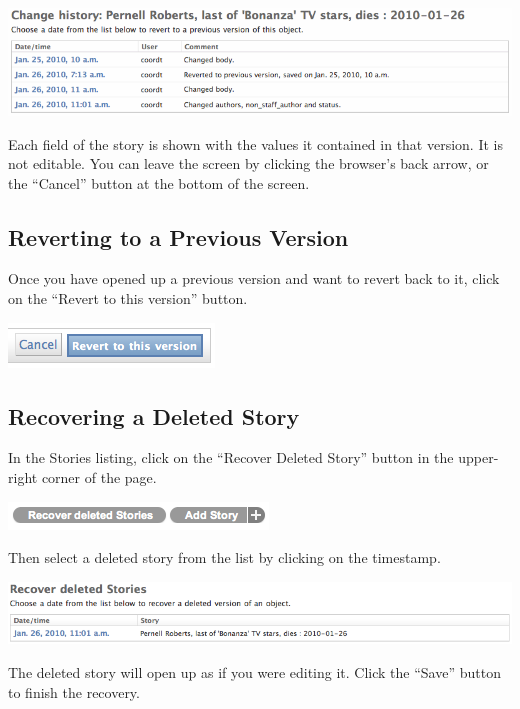 \documentclass[letterpaper,10pt,english]{manual}
\begin{document}
\includegraphics{history_list.png}

Each field of the story is shown with the values it contained in that version. It is not editable. You can leave the screen by clicking the browser's back arrow, or the ``Cancel'' button at the bottom of the screen.


\subsection{Reverting to a Previous Version}

Once you have opened up a previous version and want to revert back to it, click on the ``Revert to this version'' button.

\includegraphics{history_save_btn.png}


\subsection{Recovering a Deleted Story}

In the Stories listing, click on the ``Recover Deleted Story'' button in the upper-right corner of the page.

\includegraphics{recover_btn.png}

Then select a deleted story from the list by clicking on the timestamp.

\includegraphics{recover_list.png}

The deleted story will open up as if you were editing it. Click the ``Save'' button to finish the recovery.

\resetcurrentobjects
\hypertarget{--doc-reference/index}{}
\end{document}
